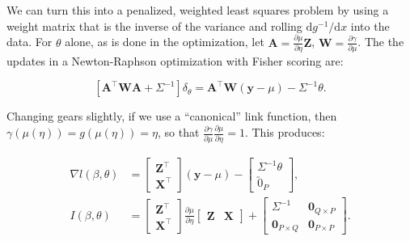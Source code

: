 \documentclass[10pt]{article}
\begin{document}
We can turn this into a penalized, weighted least squares problem by
using a weight matrix that is the inverse of the variance and rolling
$\mathrm{d}g^{-1}/\mathrm{d}x$ into the data. For $\theta$ alone, as is done in the
optimization, let $\bm{A} = \frac{\partial\mu}{\partial\eta}\bm{Z}$, $\bm{W} =
\frac{\partial\gamma}{\partial\mu}$. The the updates in a
Newton-Raphson optimization with Fisher scoring are:

\begin{equation*}
\left[\bm{A}^\top \bm{W} \bm{A} + \Sigma^{-1}\right]\delta_\theta = \bm{A}^\top \bm{W}(\bm{y} -
\mu) - \Sigma^{-1}\theta.
\end{equation*}

Changing gears slightly, if we use a ``canonical'' link function, then
$\gamma(\mu(\eta)) = g(\mu(\eta)) = \eta$, so that
$\frac{\partial\gamma}{\partial\mu} \frac{\partial\mu}{\partial\eta} =
1$. This produces:

\begin{align*}
\nabla l(\beta, \theta) & =
\begin{bmatrix}
  \bm{Z}^\top \\ \bm{X}^\top
\end{bmatrix}
(\bm{y} - \mu) -
\begin{bmatrix}
  \Sigma^{-1}\theta \\ \utilde{0}_P
\end{bmatrix}, \\
I(\beta, \theta) & =
\begin{bmatrix}
  \bm{Z}^\top \\ \bm{X}^\top
\end{bmatrix}
\frac{\partial\mu}{\partial\eta}
\begin{bmatrix}
  \bm{Z} & \bm{X}
\end{bmatrix} + 
\begin{bmatrix} \Sigma^{-1} & \bm{0}_{Q\times P} \\
\bm{0}_{P\times Q} & \bm{0}_{P\times P}
\end{bmatrix}.
\end{align*}
\end{document}

